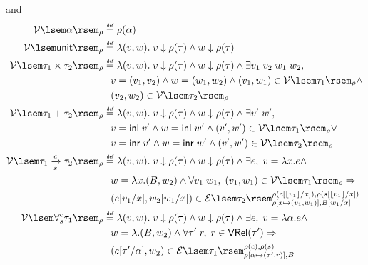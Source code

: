\documentclass[preprint]{sigplanconf}
\newcommand{\arrow}[4]{#1\xrightarrow[#3]{#2}#4}
\newcommand{\syminl}{\mathsf{inl}}
\newcommand{\syminr}{\mathsf{inr}}
\newcommand{\symunit}{\mathsf{unit}}
\newcommand{\relV}[1]{\mathcal{V}\lsem#1\rsem}
\newcommand{\relE}[1]{\mathcal{E}\lsem#1\rsem}
\newcommand{\vtos}[1]{\lfloor #1 \rfloor}
\newcommand\defeq{\mathrel{\overset{\makebox[0pt]{\mbox{\normalfont\tiny\sffamily def}}}{=}}}
\begin{document}
\begin{figure}
\fbox{$\relV{\tau}$} and \fbox{$\relE{\tau}$}
{\small
\begin{align*}
  \relV{\alpha}_\rho &\defeq \rho(\alpha) \\
  \relV{\symunit}_\rho &\defeq \lambda(v,w).\; v \downarrow \rho(\tau) \wedge w \downarrow \rho(\tau) \\
  \relV{\tau_1\times\tau_2}_\rho &\defeq \lambda(v,w).\; v \downarrow \rho(\tau) \wedge w \downarrow \rho(\tau) \wedge \exists v_1\;v_2\;w_1\;w_2, \\
  & \hspace{.1in} v=(v_1,v_2) \wedge w=(w_1,w_2) \wedge (v_1,w_1) \in \relV{\tau_1}_\rho \wedge \\
  & \hspace{.1in} (v_2,w_2) \in \relV{\tau_2}_\rho \\
  \relV{\tau_1+\tau_2}_\rho &\defeq \lambda(v,w).\; v \downarrow \rho(\tau) \wedge w \downarrow \rho(\tau) \wedge \exists v'\;w', \\
  & \hspace{.1in} v=\syminl\;v' \wedge w=\syminl\;w' \wedge (v',w') \in \relV{\tau_1}_\rho \vee \\
  & \hspace{.1in} v=\syminr\;v' \wedge w=\syminr\;w' \wedge (v',w') \in \relV{\tau_2}_\rho \\
  \relV{\arrow{\tau_1}{c}{s}{\tau_2}}_\rho &\defeq \lambda (v,w).\;v \downarrow \rho(\tau) \wedge w \downarrow \rho(\tau) \wedge \exists e,\;v=\lambda x.e \wedge \\
  & \hspace{.1in} w=\lambda x.(B,w_2) \wedge \forall v_1\;w_1,\;(v_1,w_1) \in \relV{\tau_1}_\rho \Rightarrow \\
  & \hspace{.1in} (e[v_1/x], w_2[w_1/x])\in \relE{\tau_2}^{\rho(c[\vtos{v_1}/x]),\rho(s[\vtos{v_1}/x])}_{\rho[x\mapsto(v_1,w_1)],B[w_1/x]} \\
  \relV{\forall^c_s\tau_1}_\rho &\defeq \lambda (v,w).\;v \downarrow \rho(\tau) \wedge w \downarrow \rho(\tau) \wedge \exists e,\;v=\lambda\alpha.e \wedge \\
  & \hspace{.1in} w=\lambda.(B,w_2) \wedge \forall \tau'\;r,\;r \in \mathsf{VRel}(\tau') \Rightarrow \\
  & \hspace{.1in} (e[\tau'/\alpha], w_2)\in \relE{\tau_1}^{\rho(c),\rho(s)}_{\rho[\alpha\mapsto(\tau',r)],B} \\

\end{align*}}
\end{figure}
\end{document}
